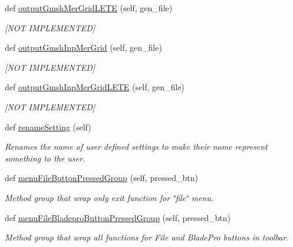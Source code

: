 \begin{DoxyCompactItemize}
def \hyperlink{classbladepro__modules_1_1inputfile__writer_1_1_input_writer_window_a36211b3ff2243e25921e48d71b9dcf7c}{output\+Gmsh\+Mer\+Grid\+L\+E\+TE} (self, gen\+\_\+file)
\begin{DoxyCompactList}\small\item\em \mbox{[}N\+OT I\+M\+P\+L\+E\+M\+E\+N\+T\+ED\mbox{]} \end{DoxyCompactList}\item 
def \hyperlink{classbladepro__modules_1_1inputfile__writer_1_1_input_writer_window_a258f943645c60945cbb97494db0ebf52}{output\+Gmsh\+Inp\+Mer\+Grid} (self, gen\+\_\+file)
\begin{DoxyCompactList}\small\item\em \mbox{[}N\+OT I\+M\+P\+L\+E\+M\+E\+N\+T\+ED\mbox{]} \end{DoxyCompactList}\item 
def \hyperlink{classbladepro__modules_1_1inputfile__writer_1_1_input_writer_window_aa07573686af3bd04e4ff42c3dddcf975}{output\+Gmsh\+Inp\+Mer\+Grid\+L\+E\+TE} (self, gen\+\_\+file)
\begin{DoxyCompactList}\small\item\em \mbox{[}N\+OT I\+M\+P\+L\+E\+M\+E\+N\+T\+ED\mbox{]} \end{DoxyCompactList}\item 
def \hyperlink{classbladepro__modules_1_1inputfile__writer_1_1_input_writer_window_a464a8ac16bcb67d41a6d91ee8b51acf2}{rename\+Setting} (self)
\begin{DoxyCompactList}\small\item\em Renames the name of user defined settings to make their name represent something to the user. \end{DoxyCompactList}\item 
def \hyperlink{classbladepro__modules_1_1inputfile__writer_1_1_input_writer_window_a35cf87c6230239ce47b33bda03bd7432}{menu\+File\+Button\+Pressed\+Group} (self, pressed\+\_\+btn)
\begin{DoxyCompactList}\small\item\em Method group that wrap only exit function for \char`\"{}file\char`\"{} menu. \end{DoxyCompactList}\item 
def \hyperlink{classbladepro__modules_1_1inputfile__writer_1_1_input_writer_window_ad94f49b4827a3ea0b56070e0149ae2aa}{menu\+File\+Bladepro\+Button\+Pressed\+Group} (self, pressed\+\_\+btn)
\begin{DoxyCompactList}\small\item\em Method group that wrap all functions for File and Blade\+Pro buttons in toolbar. \end{DoxyCompactList}\item 

\end{DoxyCompactItemize}
